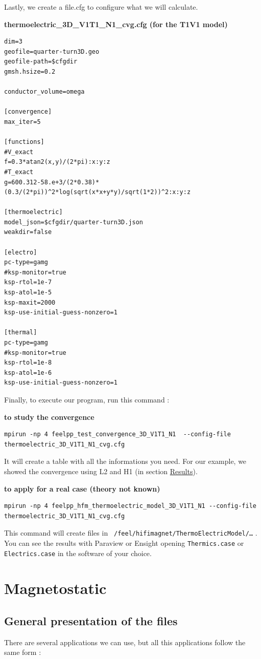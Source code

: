 \documentclass[11pt]{amsart}
\begin{document}
Lastly, we create a file.cfg to configure what we will calculate.


{\bf \hypertarget{example-file.cfg}{thermoelectric_3D_V1T1_N1_cvg.cfg (for the T1V1 model)}}\vspace{-1\baselineskip}
\begin{verbatim}
dim=3
geofile=quarter-turn3D.geo
geofile-path=$cfgdir
gmsh.hsize=0.2

conductor_volume=omega

[convergence]
max_iter=5

[functions]
#V_exact
f=0.3*atan2(x,y)/(2*pi):x:y:z
#T_exact
g=600.312-58.e+3/(2*0.38)*(0.3/(2*pi))^2*log(sqrt(x*x+y*y)/sqrt(1*2))^2:x:y:z

[thermoelectric]
model_json=$cfgdir/quarter-turn3D.json
weakdir=false

[electro]
pc-type=gamg
#ksp-monitor=true
ksp-rtol=1e-7
ksp-atol=1e-5
ksp-maxit=2000
ksp-use-initial-guess-nonzero=1

[thermal]
pc-type=gamg
#ksp-monitor=true
ksp-rtol=1e-8
ksp-atol=1e-6
ksp-use-initial-guess-nonzero=1
\end{verbatim}

Finally, to execute our program, run this command :


{\bf to study the convergence}\vspace{-1\baselineskip}
\begin{verbatim}
mpirun -np 4 feelpp_test_convergence_3D_V1T1_N1  --config-file thermoelectric_3D_V1T1_N1_cvg.cfg
\end{verbatim}

It will create a table with all the informations you need. For our example, we showed the convergence using L2 and H1 (in section \hyperlink{x-results}{Results}).


{\bf to apply for a real case (theory not known)}\vspace{-1\baselineskip}
\begin{verbatim}
mpirun -np 4 feelpp_hfm_thermoelectric_model_3D_V1T1_N1 --config-file thermoelectric_3D_V1T1_N1_cvg.cfg
\end{verbatim}

This command will create files in \texttt{~/feel/hifimagnet/ThermoElectricModel/…​} . You can see the results with Paraview or Ensight opening \texttt{Thermics.case} or \texttt{Electrics.case} in the software of your choice.


\hypertarget{x-\textbf{magnetostatic}}{\section{\textbf{Magnetostatic}}}
\hypertarget{x-general-presentation-of-the-files}{\subsection{General presentation of the files}}
There are several applications we can use, but all this applications follow the same form :
\end{document}
